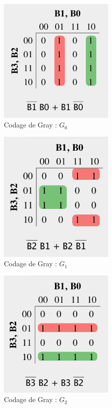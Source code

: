 \documentclass{book}
\theoremstyle{definition}
\theoremstyle{definition}
\begin{document}
\begin{figure}
\includegraphics[width=0.5\textwidth]{media/SysLogiques/gray0.png}
    \centering
    \caption{Codage de Gray : $G_0$}
    \label{fig:gray0}
\end{figure}

\begin{figure}
\includegraphics[width=0.5\textwidth]{media/SysLogiques/gray1.png}
    \centering
    \caption{Codage de Gray : $G_1$}
    \label{fig:gray1}
\end{figure}

\begin{figure}
\includegraphics[width=0.5\textwidth]{media/SysLogiques/gray2.png}
    \centering
    \caption{Codage de Gray : $G_2$}
    \label{fig:gray2}
\end{figure}
\end{document}
